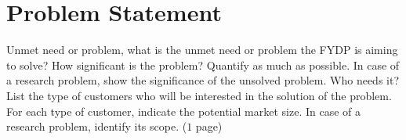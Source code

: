 
\chapter{Problem Statement}
\label{Chapter2}

Unmet need or problem, what is the unmet need or problem the FYDP is aiming to solve? How significant is the problem? Quantify as much as possible. In case of a research problem, show the significance of the unsolved problem. Who needs it? List the type of customers who will be interested in the solution of the problem. For each type of customer, indicate the potential market size. In case of a research problem, identify its scope. ($1$ page)
